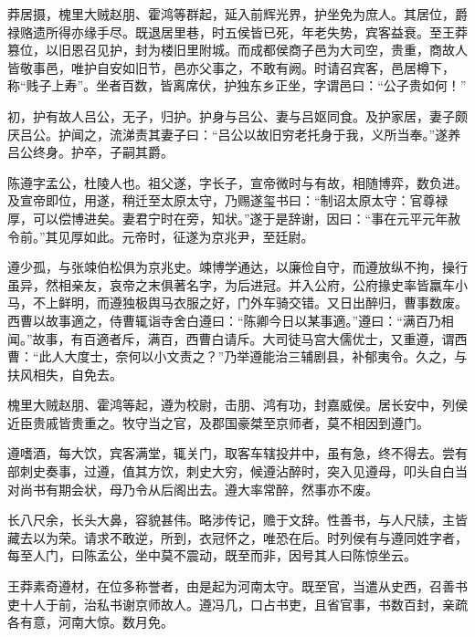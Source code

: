 \documentclass[12pt,UTF8]{ctexbook}
\begin{document}
莽居摄，槐里大贼赵朋、霍鸿等群起，延入前辉光界，护坐免为庶人。其居位，爵禄赂遗所得亦缘手尽。既退居里巷，时五侯皆已死，年老失势，宾客益衰。至王莽篡位，以旧恩召见护，封为楼旧里附城。而成都侯商子邑为大司空，贵重，商故人皆敬事邑，唯护自安如旧节，邑亦父事之，不敢有阙。时请召宾客，邑居樽下，称“贱子上寿”。坐者百数，皆离席伏，护独东乡正坐，字谓邑曰：“公子贵如何！”



初，护有故人吕公，无子，归护。护身与吕公、妻与吕妪同食。及护家居，妻子颇厌吕公。护闻之，流涕责其妻子曰：“吕公以故旧穷老托身于我，义所当奉。”遂养吕公终身。护卒，子嗣其爵。



陈遵字孟公，杜陵人也。祖父遂，字长子，宣帝微时与有故，相随博弈，数负进。及宣帝即位，用遂，稍迁至太原太守，乃赐遂玺书曰：“制诏太原太守：官尊禄厚，可以偿博进矣。妻君宁时在旁，知状。”遂于是辞谢，因曰：“事在元平元年赦令前。”其见厚如此。元帝时，征遂为京兆尹，至廷尉。



遵少孤，与张竦伯松俱为京兆史。竦博学通达，以廉俭自守，而遵放纵不拘，操行虽异，然相亲友，哀帝之末俱著名字，为后进冠。并入公府，公府掾史率皆羸车小马，不上鲜明，而遵独极舆马衣服之好，门外车骑交错。又日出醉归，曹事数废。西曹以故事適之，侍曹辄诣寺舍白遵曰：“陈卿今日以某事適。”遵曰：“满百乃相闻。”故事，有百適者斥，满百，西曹白请斥。大司徒马宫大儒优士，又重遵，谓西曹：“此人大度士，奈何以小文责之？”乃举遵能治三辅剧县，补郁夷令。久之，与扶风相失，自免去。



槐里大贼赵朋、霍鸿等起，遵为校尉，击朋、鸿有功，封嘉威侯。居长安中，列侯近臣贵戚皆贵重之。牧守当之官，及郡国豪桀至京师者，莫不相因到遵门。



遵嗜酒，每大饮，宾客满堂，辄关门，取客车辖投井中，虽有急，终不得去。尝有部刺史奏事，过遵，值其方饮，刺史大穷，候遵沾醉时，突入见遵母，叩头自白当对尚书有期会状，母乃令从后阁出去。遵大率常醉，然事亦不废。



长八尺余，长头大鼻，容貌甚伟。略涉传记，赡于文辞。性善书，与人尺牍，主皆藏去以为荣。请求不敢逆，所到，衣冠怀之，唯恐在后。时列侯有与遵同姓字者，每至人门，曰陈孟公，坐中莫不震动，既至而非，因号其人曰陈惊坐云。



王莽素奇遵材，在位多称誉者，由是起为河南太守。既至官，当遣从史西，召善书吏十人于前，治私书谢京师故人。遵冯几，口占书吏，且省官事，书数百封，亲疏各有意，河南大惊。数月免。
\end{document}
